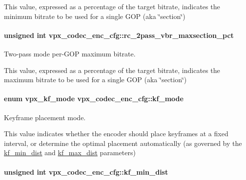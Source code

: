 This value, expressed as a percentage of the target bitrate, indicates the minimum bitrate to be used for a single G\-O\-P (aka \char`\"{}section\char`\"{}) \hypertarget{structvpx__codec__enc__cfg_ab5212050b71b2d9f4dc663caa496949e}{
\paragraph[{rc\-\_\-2pass\-\_\-vbr\-\_\-maxsection\-\_\-pct}]{\setlength{\rightskip}{0pt plus 5cm}unsigned int vpx\-\_\-codec\-\_\-enc\-\_\-cfg\-::rc\-\_\-2pass\-\_\-vbr\-\_\-maxsection\-\_\-pct}}\label{structvpx__codec__enc__cfg_ab5212050b71b2d9f4dc663caa496949e}


Two-\/pass mode per-\/\-G\-O\-P maximum bitrate. 

This value, expressed as a percentage of the target bitrate, indicates the maximum bitrate to be used for a single G\-O\-P (aka \char`\"{}section\char`\"{}) \hypertarget{structvpx__codec__enc__cfg_a491d67f061dcdb13f60c017563e9d788}{
\paragraph[{kf\-\_\-mode}]{\setlength{\rightskip}{0pt plus 5cm}enum {\bf vpx\-\_\-kf\-\_\-mode} vpx\-\_\-codec\-\_\-enc\-\_\-cfg\-::kf\-\_\-mode}}\label{structvpx__codec__enc__cfg_a491d67f061dcdb13f60c017563e9d788}


Keyframe placement mode. 

This value indicates whether the encoder should place keyframes at a fixed interval, or determine the optimal placement automatically (as governed by the \hyperlink{structvpx__codec__enc__cfg_a0a7b5444ecb09745cbe8d5af17553846}{kf\-\_\-min\-\_\-dist} and \hyperlink{structvpx__codec__enc__cfg_ae018440136e271743376730413d25a9b}{kf\-\_\-max\-\_\-dist} parameters) \hypertarget{structvpx__codec__enc__cfg_a0a7b5444ecb09745cbe8d5af17553846}{
\paragraph[{kf\-\_\-min\-\_\-dist}]{\setlength{\rightskip}{0pt plus 5cm}unsigned int vpx\-\_\-codec\-\_\-enc\-\_\-cfg\-::kf\-\_\-min\-\_\-dist}}\label{structvpx__codec__enc__cfg_a0a7b5444ecb09745cbe8d5af17553846}


